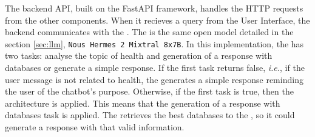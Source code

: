 The backend API, built on the FastAPI framework, handles the HTTP requests from the other components. When it recieves a query from the User Interface, the backend communicates with the {\llm}. The {\llm} is the same open model detailed in the section \ref{sec:llm}, \texttt{Nous Hermes 2 Mixtral 8x7B}. In this implementation, the {\llm} has two tasks: analyse the topic of health and generation of a response with databases or generate a simple response. If the first task returns false, \textit{i.e.}, if the user message is not related to health, the {\llm} generates a simple response reminding the user of the chatbot's purpose. Otherwise, if the first task is true, then the {\rag} architecture is applied. This means that the generation of a response with databases task is applied. The {\bm} retrieves the best databases to the {\llm}, so it could generate a response with that valid information.


